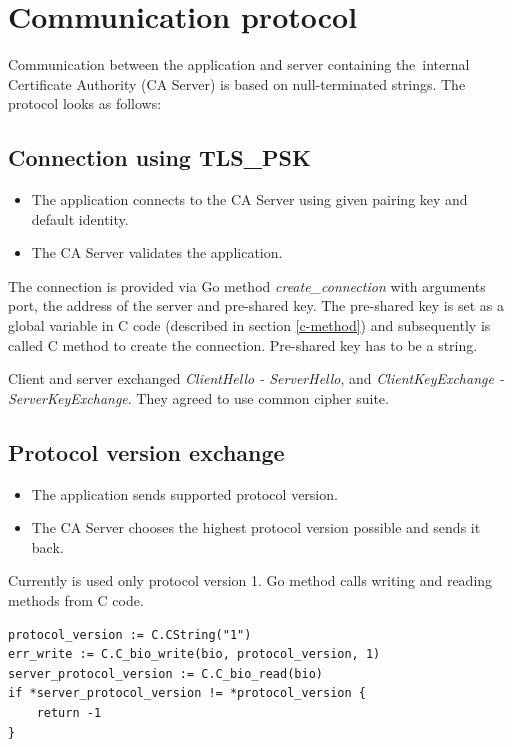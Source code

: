 \documentclass[
  oneside, 12pt, 
  printed, %
  notable,   %
  nolof,     %
  nolot,     %
]{fithesis3}
\begin{document}
\section{Communication protocol}\label{comprot}
Communication between the application and server containing the~internal Certificate Authority (CA Server) is based on null-terminated strings. The protocol looks as follows:

\subsection{Connection using TLS\_PSK}
\begin{itemize}[leftmargin=2em,rightmargin=1em,itemsep=0.75\parskip,parsep=0em,topsep=0em,partopsep=0em]
\item The application connects to the CA Server using given pairing key and default identity.
\item The CA Server validates the application.
\end{itemize}

The connection is provided via Go method \textit{create\_connection} with arguments port, the 
address of the server and pre-shared key. The pre-shared key is set as a global variable in C code 
(described in section \ref{c-method}) and subsequently is called C method to create the connection. 
Pre-shared key has to be a string.

Client and server exchanged \textit{ClientHello - ServerHello}, and \textit{ClientKeyExchange - 
ServerKeyExchange}. They agreed to use common cipher suite. 

\subsection{Protocol version exchange}
\begin{itemize}[leftmargin=2em,rightmargin=1em,itemsep=0.75\parskip,parsep=0em,topsep=0em,partopsep=0em]
\item The application sends supported protocol version.
\item The CA Server chooses the highest protocol version possible and sends it back.
\end{itemize}

Currently is used only protocol version 1. Go method calls writing and reading methods from C 
code.

\begin{lstlisting}
protocol_version := C.CString("1")
err_write := C.C_bio_write(bio, protocol_version, 1)
server_protocol_version := C.C_bio_read(bio)
if *server_protocol_version != *protocol_version {
	return -1
} 
\end{lstlisting}
\end{document}
